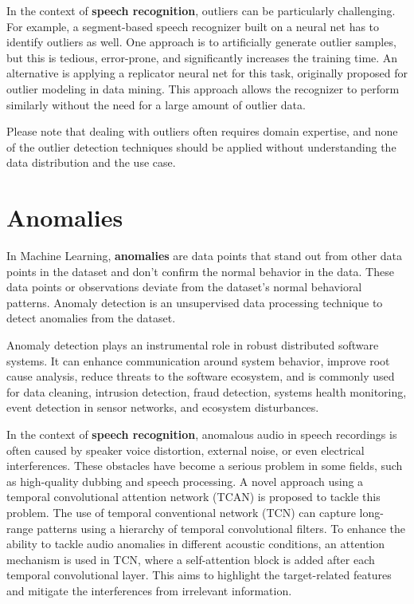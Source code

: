 In the context of \textbf{speech recognition}, outliers can be particularly challenging. For example, a segment-based speech recognizer built on a neural net has to identify outliers as well. One approach is to artificially generate outlier samples, but this is tedious, error-prone, and significantly increases the training time. An alternative is applying a replicator neural net for this task, originally proposed for outlier modeling in data mining. This approach allows the recognizer to perform similarly without the need for a large amount of outlier data.

Please note that dealing with outliers often requires domain expertise, and none of the outlier detection techniques should be applied without understanding the data distribution and the use case. 

\section{Anomalies}
In Machine Learning, \textbf{anomalies} are data points that stand out from other data points in the dataset and don’t confirm the normal behavior in the data\cite{Kumar:2023}. These data points or observations deviate from the dataset’s normal behavioral patterns\cite{Johnson:2023}. Anomaly detection is an unsupervised data processing technique to detect anomalies from the dataset.

Anomaly detection plays an instrumental role in robust distributed software systems. It can enhance communication around system behavior, improve root cause analysis, reduce threats to the software ecosystem, and is commonly used for data cleaning, intrusion detection, fraud detection, systems health monitoring, event detection in sensor networks, and ecosystem disturbances.

In the context of \textbf{speech recognition}, anomalous audio in speech recordings is often caused by speaker voice distortion, external noise, or even electrical interferences. These obstacles have become a serious problem in some fields, such as high-quality dubbing and speech processing. A novel approach using a temporal convolutional attention network (TCAN) is proposed to tackle this problem. The use of temporal conventional network (TCN) can capture long-range patterns using a hierarchy of temporal convolutional filters. To enhance the ability to tackle audio anomalies in different acoustic conditions, an attention mechanism is used in TCN, where a self-attention block is added after each temporal convolutional layer\cite{Huang:2021}. This aims to highlight the target-related features and mitigate the interferences from irrelevant information.



